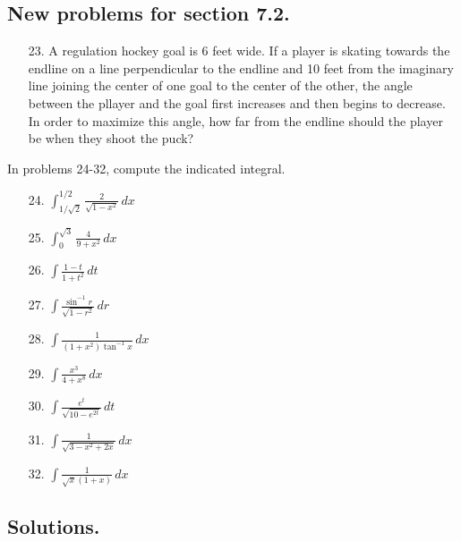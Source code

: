 \documentclass[12pt]{report}
\begin{document}
\subsection*{New problems for section 7.2.}

\begin{itemize}
\item[23.] A regulation hockey goal is 6 feet wide. If a player is skating towards the endline on a line perpendicular to the endline and 10 feet from the imaginary line joining the center of one goal to the center of the other, the angle between the pllayer and the goal first increases and then begins to decrease. In order to maximize this angle, how far from the endline should the player be when they shoot the puck?

\end{itemize}

\medbreak\noindent
In problems 24-32, compute the indicated integral.

\begin{itemize}
\item[24.] $\displaystyle \int_{1/\sqrt 2}^{1/2} \frac{2}{\sqrt{1-x^2}}\,dx$
\item[25.] $\displaystyle \int_{0}^{\sqrt 3}  \frac{4}{9+x^2}\,dx$
\item[26.] $\displaystyle \int \frac{1-t}{1+t^2}\,dt$
\item[27.] $\displaystyle \int \frac{\sin^{-1}r}{\sqrt{1-r^2}}\,dr$
\item[28.] $\displaystyle \int \frac{1}{(1+x^2)\tan^{-1}x}\,dx$
\item[29.] $\displaystyle \int \frac{x^3}{4+x^8}\,dx$
\item[30.] $\displaystyle \int \frac{e^t}{\sqrt{10-e^{2t}}}\,dt$
\item[31.] $\displaystyle \int \frac{1}{\sqrt{3-x^2+2x}}\,dx$
\item[32.] $\displaystyle \int \frac{1}{\sqrt x(1+x)}\,dx$
\end{itemize}

\subsection*{Solutions.}
\end{document}
